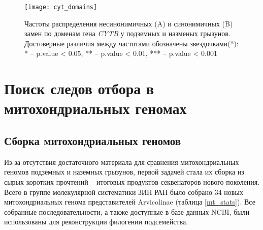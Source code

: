 \begin{figure}[h!]
	\begin{center}
		\texttt{[image: cyt\_domains]}
	\end{center}
	\caption{Частоты распределения несинонимичных (A) и синонимичных (B) замен по доменам гена \textit{CYTB} у подземных и назменых грызунов. Достоверные различия между частотами обозначены звездочками(*): * -- p.value < 0.05, ** -- p.value < 0.01, *** -- p.value < 0.001 }\label{Cyt_Dom_fig}
\end{figure}


\clearpage

\section{Поиск следов отбора в митохондриальных геномах}

\subsection{Сборка митохондриальных геномов}

Из-за отсутствия достаточного материала для сравнения митохондриальных геномов подземных и наземных грызунов, первой задачей стала их сборка из сырых коротких прочтений -- итоговых продуктов секвенаторов нового поколения. Всего в группе молекулярной систематики ЗИН РАН было собрано 34 новых митохондриальных генома представителей Arvicolinae (таблица \ref{mt_stats}). Все собранные последовательности, а также доступные в базе данных NCBI, были использованы для реконструкции филогении подсемейства.



